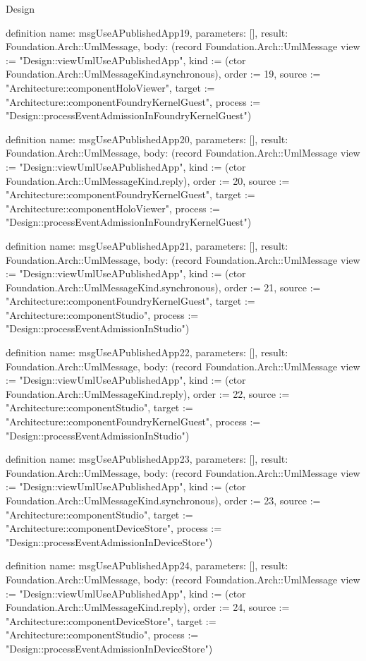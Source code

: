 \begin{lexlean}{Design}
\begin{semanticmodule}
definition{
  name: msgUseAPublishedApp19,
  parameters: [],
  result: Foundation.Arch::UmlMessage,
  body: (record Foundation.Arch::UmlMessage {view := "Design::viewUmlUseAPublishedApp", kind := (ctor Foundation.Arch::UmlMessageKind.synchronous), order := 19, source := "Architecture::componentHoloViewer", target := "Architecture::componentFoundryKernelGuest", process := "Design::processEventAdmissionInFoundryKernelGuest"})
}

definition{
  name: msgUseAPublishedApp20,
  parameters: [],
  result: Foundation.Arch::UmlMessage,
  body: (record Foundation.Arch::UmlMessage {view := "Design::viewUmlUseAPublishedApp", kind := (ctor Foundation.Arch::UmlMessageKind.reply), order := 20, source := "Architecture::componentFoundryKernelGuest", target := "Architecture::componentHoloViewer", process := "Design::processEventAdmissionInFoundryKernelGuest"})
}

definition{
  name: msgUseAPublishedApp21,
  parameters: [],
  result: Foundation.Arch::UmlMessage,
  body: (record Foundation.Arch::UmlMessage {view := "Design::viewUmlUseAPublishedApp", kind := (ctor Foundation.Arch::UmlMessageKind.synchronous), order := 21, source := "Architecture::componentFoundryKernelGuest", target := "Architecture::componentStudio", process := "Design::processEventAdmissionInStudio"})
}

definition{
  name: msgUseAPublishedApp22,
  parameters: [],
  result: Foundation.Arch::UmlMessage,
  body: (record Foundation.Arch::UmlMessage {view := "Design::viewUmlUseAPublishedApp", kind := (ctor Foundation.Arch::UmlMessageKind.reply), order := 22, source := "Architecture::componentStudio", target := "Architecture::componentFoundryKernelGuest", process := "Design::processEventAdmissionInStudio"})
}

definition{
  name: msgUseAPublishedApp23,
  parameters: [],
  result: Foundation.Arch::UmlMessage,
  body: (record Foundation.Arch::UmlMessage {view := "Design::viewUmlUseAPublishedApp", kind := (ctor Foundation.Arch::UmlMessageKind.synchronous), order := 23, source := "Architecture::componentStudio", target := "Architecture::componentDeviceStore", process := "Design::processEventAdmissionInDeviceStore"})
}

definition{
  name: msgUseAPublishedApp24,
  parameters: [],
  result: Foundation.Arch::UmlMessage,
  body: (record Foundation.Arch::UmlMessage {view := "Design::viewUmlUseAPublishedApp", kind := (ctor Foundation.Arch::UmlMessageKind.reply), order := 24, source := "Architecture::componentDeviceStore", target := "Architecture::componentStudio", process := "Design::processEventAdmissionInDeviceStore"})
}


\end{semanticmodule}
\end{lexlean}
